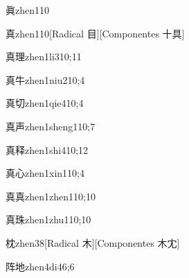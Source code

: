 \begin{verbete}{眞}{zhen1}{10}
\end{verbete}

\begin{verbete}{真}{zhen1}{10}[Radical 目][Componentes 十具]
\end{verbete}

\begin{verbete}{真理}{zhen1li3}{10;11}
\end{verbete}

\begin{verbete}{真牛}{zhen1niu2}{10;4}
\end{verbete}

\begin{verbete}{真切}{zhen1qie4}{10;4}
\end{verbete}

\begin{verbete}{真声}{zhen1sheng1}{10;7}
\end{verbete}

\begin{verbete}{真释}{zhen1shi4}{10;12}
\end{verbete}

\begin{verbete}{真心}{zhen1xin1}{10;4}
\end{verbete}

\begin{verbete}{真真}{zhen1zhen1}{10;10}
\end{verbete}

\begin{verbete}{真珠}{zhen1zhu1}{10;10}
\end{verbete}

\begin{verbete}{枕}{zhen3}{8}[Radical 木][Componentes 木冘]
\end{verbete}

\begin{verbete}{阵地}{zhen4di4}{6;6}
\end{verbete}

